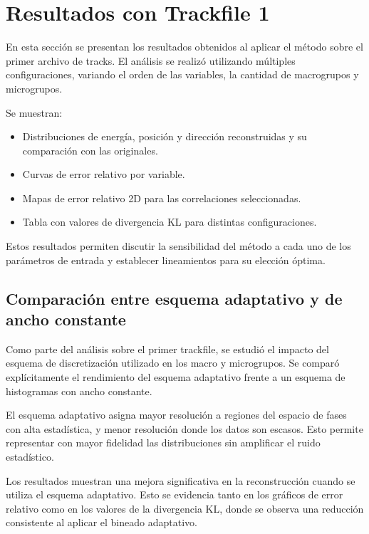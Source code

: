 \section{Resultados con Trackfile 1}
\label{sec:resultados-track1}

En esta sección se presentan los resultados obtenidos al aplicar el método sobre el primer archivo de tracks. El análisis se realizó utilizando múltiples configuraciones, variando el orden de las variables, la cantidad de macrogrupos y microgrupos.

Se muestran:

\begin{itemize}
    \item Distribuciones de energía, posición y dirección reconstruidas y su comparación con las originales.
    \item Curvas de error relativo por variable.
    \item Mapas de error relativo 2D para las correlaciones seleccionadas.
    \item Tabla con valores de divergencia KL para distintas configuraciones.
\end{itemize}

Estos resultados permiten discutir la sensibilidad del método a cada uno de los parámetros de entrada y establecer lineamientos para su elección óptima.

\subsection{Comparación entre esquema adaptativo y de ancho constante}
\label{subsec:adaptativo-vs-constante}

Como parte del análisis sobre el primer trackfile, se estudió el impacto del esquema de discretización utilizado en los macro y microgrupos. Se comparó explícitamente el rendimiento del esquema adaptativo frente a un esquema de histogramas con ancho constante.

El esquema adaptativo asigna mayor resolución a regiones del espacio de fases con alta estadística, y menor resolución donde los datos son escasos. Esto permite representar con mayor fidelidad las distribuciones sin amplificar el ruido estadístico.

Los resultados muestran una mejora significativa en la reconstrucción cuando se utiliza el esquema adaptativo. Esto se evidencia tanto en los gráficos de error relativo como en los valores de la divergencia KL, donde se observa una reducción consistente al aplicar el bineado adaptativo.

